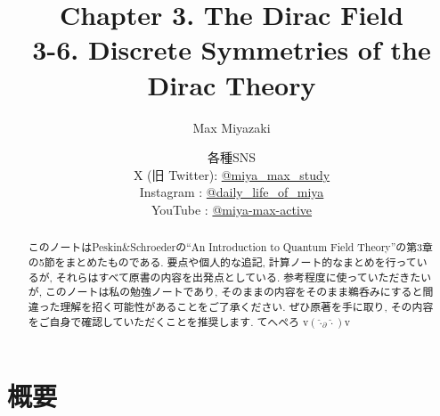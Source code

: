 \documentclass[a4paper,12pt]{article}
\title{Chapter 3. The Dirac Field\\
3-6. Discrete Symmetries of the Dirac Theory}
\date{各種SNS\\
    X (旧 Twitter): \href{https://x.com/miya_max_study}{@miya\_max\_study}\\
    Instagram : \href{https://www.instagram.com/daily_life_of_miya/}{@daily\_life\_of\_miya}\\
    YouTube : \href{https://www.youtube.com/@miya-max-active}{@miya-max-active}
    }
\author{Max Miyazaki}
\begin{document}
\maketitle

\vspace{1cm}
\begin{abstract}
    このノートはPeskin\&Schroederの``An Introduction to Quantum Field Theory''の第3章の5節をまとめたものである. 要点や個人的な追記, 計算ノート的なまとめを行っているが, それらはすべて原書の内容を出発点としている. 参考程度に使っていただきたいが, このノートは私の勉強ノートであり, そのままの内容をそのまま鵜呑みにすると間違った理解を招く可能性があることをご了承ください. ぜひ原著を手に取り, その内容をご自身で確認していただくことを推奨します. てへぺろ v$({\hat{\cdot}_\partial \hat{\cdot}})$v
\end{abstract}
    
    

\newpage
\color{blue}
\section*{概要}
\end{document}
